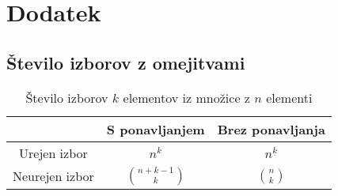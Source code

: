 \section{Dodatek}

\renewcommand{\thesubsection}{\Alph{subsection}}
\renewcommand{\arraystretch}{2}

\subsection{Število izborov z omejitvami}

\begin{table}[!ht]
\centering
\caption{Število izborov $k$ elementov iz množice z $n$ elementi}
\begin{tabular}{c|cc}
               & S ponavljanjem     & Brez ponavljanja    \\ 
               \hline 
Urejen izbor   & $\displaystyle n^k$              & $\displaystyle n^{\underline{k}}$ \\ 
Neurejen izbor & $\displaystyle \binom{n+k-1}{k}$ & $\displaystyle \binom{n}{k}$      \\ 
\end{tabular} 
\end{table}
